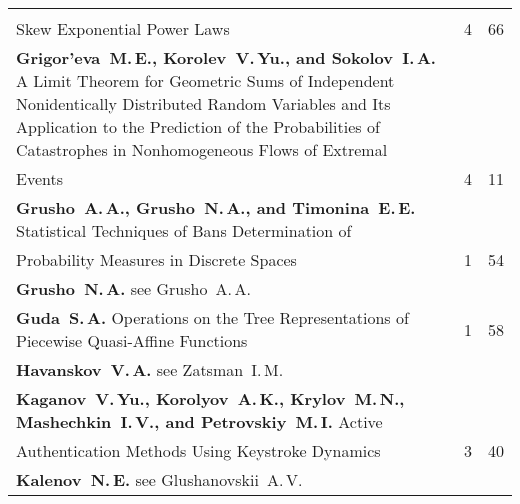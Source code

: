 {\begin{tabular}{p{399pt}rr}
\vspace*{-12pt}\\
\hspace*{23pt}Skew Exponential Power Laws\dotfill&4&66\\
\hangindent=23pt\noindent\textbf{Grigor'eva~M.\,E., Korolev~V.\,Yu., and Sokolov~I.\,A.}
A Limit Theorem for Geometric Sums of Independent Nonidentically Distributed
Random Variables and Its Application to the Pre\-diction of the Probabilities
of Catastrophes in Nonhomogeneous Flows of Extremal\linebreak
\vspace*{-12pt}\\
\hspace*{23pt}Events\dotfill&4&11\\
\textbf{Grusho~A.\,A., Grusho~N.\,A., and Timonina~E.\,E.}
Statistical Techniques of Bans Determination of\linebreak
\vspace*{-12pt}\\
\hspace*{23pt}Probability Measures in Discrete Spaces\dotfill&1&54\\
\textbf{Grusho~N.\,A.} see Grusho~A.\,A.&&\\
\textbf{Guda~S.\,A.}
Operations on the Tree Representations of Piecewise Quasi-Affine Functions\dotfill&1&58\\
\textbf{Havanskov~V.\,A.} see Zatsman~I.\,M.&&\\
\textbf{Kaganov~V.\,Yu., Korolyov~A.\,K., Krylov~M.\,N.,
Mashechkin~I.\,V., and Petrovskiy~M.\,I.}
Active\linebreak
\vspace*{-12pt}\\
\hspace*{23pt}Authentication Methods Using Keystroke Dynamics\dotfill&3& 40\\
\textbf{Kalenov~N.\,E.} see Glushanovskii~A.\,V.&&\\
\end{tabular}
}
\pagebreak

\def\leftfootline{\small{\textbf{\thepage}
\hfill INFORMATIKA I EE PRIMENENIYA~--- INFORMATICS AND APPLICATIONS\ \ \ 2013\ 
\ \ volume~7\ \ \ issue\ 4}
}%
 \def\rightfootline{\small{INFORMATIKA I EE PRIMENENIYA~--- INFORMATICS AND APPLICATIONS\ \ \ 2013\ \ \ volume~7\ \ \ issue\ 4
\hfill \textbf{\thepage}}}

\def\leftkol{2013 AUTHOR INDEX} %

\def\rightkol{2013 AUTHOR INDEX} %


